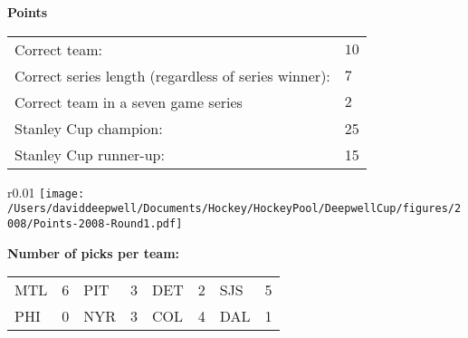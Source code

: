 \documentclass[10pt]{article}
\begin{document}
\begin{table}[!htb]
\begin{minipage}[t]{.27\linewidth}
{\bf Points}\\
\begin{tabular}{l l}
    Correct team:	& $10$\\
    Correct series length (regardless of series winner):	& $7$\\
    Correct team in a seven game series    & $2$\\
    Stanley Cup champion:	& 25\\
    Stanley Cup runner-up:	& 15\\
\end{tabular}
\hspace{0.5cm}
\begin{wrapfigure}{r}{0.01\textwidth}
    \vspace{-3cm}
	\texttt{[image: /Users/daviddeepwell/Documents/Hockey/HockeyPool/DeepwellCup/figures/2008/Points-2008-Round1.pdf]}
\end{wrapfigure}
\end{minipage}
\end{table}

\begin{minipage}[t]{.45\linewidth}
{\bf Number of picks per team:}\\
\begin{tabular}{lc | lc | lc | lc }
    MTL & 6 & PIT & 3 & DET & 2 & SJS & 5 \\
    PHI & 0 & NYR & 3 & COL & 4 & DAL & 1 \\
\end{tabular}
\end{minipage}
\end{document}
